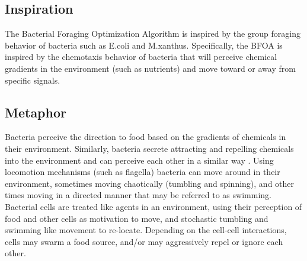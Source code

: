 \subsection{Inspiration}
The Bacterial Foraging Optimization Algorithm is inspired by the group foraging behavior of bacteria such as E.coli and M.xanthus.
Specifically, the BFOA is inspired by the chemotaxis behavior of bacteria that will perceive chemical gradients in the environment (such as nutrients) and move toward or away from specific signals.

\subsection{Metaphor}
Bacteria perceive the direction to food based on the gradients of chemicals in their environment. Similarly, bacteria secrete attracting and repelling chemicals into the environment and can perceive each other in a similar way . Using locomotion mechanisms (such as flagella) bacteria can move around in their environment, sometimes moving chaotically (tumbling and spinning), and other times moving in a directed manner that may be referred to as swimming. Bacterial cells are treated like agents in an environment, using their perception of food and other cells as motivation to move, and stochastic tumbling and swimming like movement to re-locate. Depending on the cell-cell interactions, cells may swarm a food source, and/or may aggressively repel or ignore each other.

